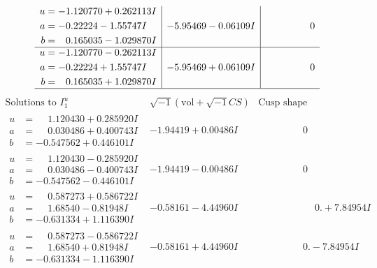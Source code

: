 \documentclass[1p]{elsarticle_modified}
\theoremstyle{definition}
\newcommand{\I}{\sqrt{-1}}
\begin{document}
$$\begin{array}{c|c|c}
\begin{aligned}
u &= -1.120770 + 0.262113 I \\
a &= -0.22224 - 1.55747 I \\
b &= \phantom{-}0.165035 - 1.029870 I\end{aligned}
 & -5.95469 - 0.06109 I & \phantom{-0.000000 } 0 \\ \hline\begin{aligned}
u &= -1.120770 - 0.262113 I \\
a &= -0.22224 + 1.55747 I \\
b &= \phantom{-}0.165035 + 1.029870 I\end{aligned}
 & -5.95469 + 0.06109 I & \phantom{-0.000000 } 0\\
 \hline 
 \end{array}$$\newpage$$\begin{array}{c|c|c}  
\text{Solutions to }I^u_{1}& \I (\text{vol} + \sqrt{-1}CS) & \text{Cusp shape}\\
 \hline 
\begin{aligned}
u &= \phantom{-}1.120430 + 0.285920 I \\
a &= \phantom{-}0.030486 + 0.400743 I \\
b &= -0.547562 + 0.446101 I\end{aligned}
 & -1.94419 + 0.00486 I & \phantom{-0.000000 } 0 \\ \hline\begin{aligned}
u &= \phantom{-}1.120430 - 0.285920 I \\
a &= \phantom{-}0.030486 - 0.400743 I \\
b &= -0.547562 - 0.446101 I\end{aligned}
 & -1.94419 - 0.00486 I & \phantom{-0.000000 } 0 \\ \hline\begin{aligned}
u &= \phantom{-}0.587273 + 0.586722 I \\
a &= \phantom{-}1.68540 - 0.81948 I \\
b &= -0.631334 + 1.116390 I\end{aligned}
 & -0.58161 - 4.44960 I & \phantom{-0.000000 -}0. + 7.84954 I \\ \hline\begin{aligned}
u &= \phantom{-}0.587273 - 0.586722 I \\
a &= \phantom{-}1.68540 + 0.81948 I \\
b &= -0.631334 - 1.116390 I\end{aligned}
 & -0.58161 + 4.44960 I & \phantom{-0.000000 } 0. - 7.84954 I \\ \hline\begin{aligned}

\end{aligned}
\end{array}$$
\end{document}
